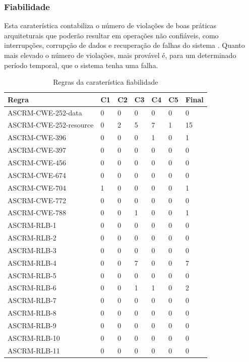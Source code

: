 \documentclass[openany,10pt,a4paper]{article}
\begin{document}
\subsubsection{Fiabilidade}
Esta caraterística contabiliza o número de violações de boas práticas arquiteturais que poderão resultar em operações não confiáveis, como interrupções, corrupção de dados e recuperação de falhas do sistema \cite{OMG_Reliability}. Quanto mais elevado o número de violações, mais provável é, para um determinado período temporal, que o sistema tenha uma falha. 
\begin{longtable}{|p{1.9in}|p{0.28in}|p{0.28in}|p{0.28in}|p{0.28in}|p{0.28in}|p{0.35in}|}
	\caption{Regras da caraterística fiabilidade}
	\label{table_Reliability}
	\endhead
	\hline	
		\textbf{Regra} & \textbf{C1} & \textbf{C2} & \textbf{C3} & \textbf{C4} & \textbf{C5} & \textbf{Final} \\ \hline
ASCRM-CWE-252-data & 0 & 0 & 0 & 0 & 0 & 0 \\ \hline
ASCRM-CWE-252-resource & 0 & 2 & 5 & 7 & 1 & 15 \\ \hline
ASCRM-CWE-396 & 0 & 0 & 0 & 1 & 0 & 1 \\ \hline
ASCRM-CWE-397 & 0 & 0 & 0 & 0 & 0 & 0 \\ \hline
ASCRM-CWE-456 & 0 & 0 & 0 & 0 & 0 & 0 \\ \hline
ASCRM-CWE-674 & 0 & 0 & 0 & 0 & 0 & 0 \\ \hline
ASCRM-CWE-704 & 1 & 0 & 0 & 0 & 0 & 1 \\ \hline
ASCRM-CWE-772 & 0 & 0 & 0 & 0 & 0 & 0 \\ \hline
ASCRM-CWE-788 & 0 & 0 & 1 & 0 & 0 & 1 \\ \hline
ASCRM-RLB-1 & 0 & 0 & 0 & 0 & 0 & 0 \\ \hline
ASCRM-RLB-2 & 0 & 0 & 0 & 0 & 0 & 0 \\ \hline
ASCRM-RLB-3 & 0 & 0 & 0 & 0 & 0 & 0 \\ \hline
ASCRM-RLB-4 & 0 & 0 & 7 & 0 & 0 & 7 \\ \hline
ASCRM-RLB-5 & 0 & 0 & 0 & 0 & 0 & 0 \\ \hline
ASCRM-RLB-6 & 0 & 0 & 1 & 1 & 0 & 2 \\ \hline
ASCRM-RLB-7 & 0 & 0 & 0 & 0 & 0 & 0 \\ \hline
ASCRM-RLB-8 & 0 & 0 & 0 & 0 & 0 & 0 \\ \hline
ASCRM-RLB-9 & 0 & 0 & 0 & 0 & 0 & 0 \\ \hline
ASCRM-RLB-10 & 0 & 0 & 0 & 0 & 0 & 0 \\ \hline
ASCRM-RLB-11 & 0 & 0 & 0 & 0 & 0 & 0 \\ \hline

\end{longtable}
\end{document}
